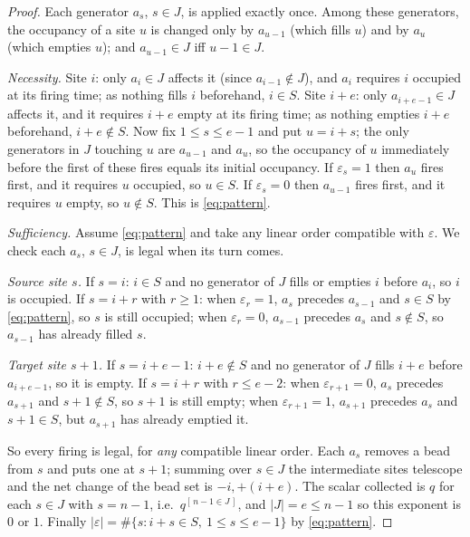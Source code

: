 \documentclass[11pt]{article}
\theoremstyle{plain}
\theoremstyle{definition}
\begin{document}
\begin{proof}
Each generator $a_s$, $s\in J$, is applied exactly once.  Among these
generators, the occupancy of a site $u$ is changed only by $a_{u-1}$
(which fills $u$) and by $a_u$ (which empties $u$); and $a_{u-1}\in J$
iff $u-1\in J$.

\emph{Necessity.}  Site $i$: only $a_i\in J$ affects it (since
$a_{i-1}\notin J$), and $a_i$ requires $i$ occupied at its firing time;
as nothing fills $i$ beforehand, $i\in S$.  Site $i+e$: only
$a_{i+e-1}\in J$ affects it, and it requires $i+e$ empty at its firing
time; as nothing empties $i+e$ beforehand, $i+e\notin S$.  Now fix
$1\le s\le e-1$ and put $u=i+s$; the only generators in $J$ touching $u$
are $a_{u-1}$ and $a_u$, so the occupancy of $u$ immediately before the
first of these fires equals its initial occupancy.  If
$\varepsilon_s=1$ then $a_u$ fires first, and it requires $u$ occupied,
so $u\in S$.  If $\varepsilon_s=0$ then $a_{u-1}$ fires first, and it
requires $u$ empty, so $u\notin S$.  This is \eqref{eq:pattern}.

\emph{Sufficiency.}  Assume \eqref{eq:pattern} and take any linear order
compatible with $\varepsilon$.  We check each $a_s$, $s\in J$, is legal
when its turn comes.

\emph{Source site $s$.}  If $s=i$: $i\in S$ and no generator of $J$ fills
or empties $i$ before $a_i$, so $i$ is occupied.  If $s=i+r$ with
$r\ge1$: when $\varepsilon_r=1$, $a_s$ precedes $a_{s-1}$ and
$s\in S$ by \eqref{eq:pattern}, so $s$ is still occupied; when
$\varepsilon_r=0$, $a_{s-1}$ precedes $a_s$ and $s\notin S$, so $a_{s-1}$
has already filled $s$.

\emph{Target site $s+1$.}  If $s=i+e-1$: $i+e\notin S$ and no generator
of $J$ fills $i+e$ before $a_{i+e-1}$, so it is empty.  If $s=i+r$ with
$r\le e-2$: when $\varepsilon_{r+1}=0$, $a_s$ precedes $a_{s+1}$ and
$s+1\notin S$, so $s+1$ is still empty; when $\varepsilon_{r+1}=1$,
$a_{s+1}$ precedes $a_s$ and $s+1\in S$, but $a_{s+1}$ has already
emptied it.

So every firing is legal, for \emph{any} compatible linear order.  Each
$a_s$ removes a bead from $s$ and puts one at $s+1$; summing over
$s\in J$ the intermediate sites telescope and the net change of the bead
set is $-i,+(i+e)$.  The scalar collected is $q$ for each $s\in J$ with
$s=n-1$, i.e.\ $q^{[\,n-1\in J\,]}$, and $|J|=e\le n-1$ so this exponent
is $0$ or $1$.  Finally $|\varepsilon|=\#\{s:i+s\in S,\ 1\le s\le e-1\}$
by \eqref{eq:pattern}.
\end{proof}
\end{document}
